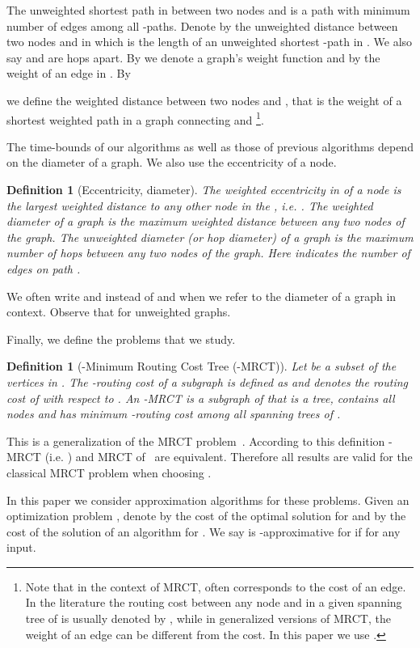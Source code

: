 \documentclass[11pt]{article}
\newtheorem{definition}[theorem]{Definition}
\begin{document}
The unweighted shortest path in  between two nodes  and  is a path with minimum number of edges among all -paths. Denote by  the unweighted distance between two nodes  and  in  which is the length of an unweighted shortest -path in . We also say  and  are  hops apart. By  we denote a graph's weight function and by  the weight of an edge in . By 

 we define the weighted distance between two nodes  and , that is the weight of a shortest weighted path in a graph  connecting  and \footnote{ Note that in the context of MRCT,  often corresponds to the cost of an edge. In the literature the routing cost between any node  and  in a given spanning tree  of  is usually denoted by , while in generalized versions of MRCT, the weight of an edge can be different from the cost. In this paper we use .}. 

The time-bounds of our algorithms as well as those of previous algorithms depend on the diameter of a graph. We also use the eccentricity of a node.
\begin{definition}[Eccentricity, diameter]
The \emph{weighted eccentricity}  in  of a node  is the largest weighted distance to any other node in the , i.e. . The \emph{weighted diameter}  of a graph  is the maximum weighted distance between any two nodes of the graph. The \emph{unweighted diameter} (or hop diameter)  of a graph  is the maximum number of hops between any two nodes of the graph. Here  indicates the number of edges on path .
\end{definition}
We often write  and  instead of  and  when we refer to the diameter of a graph  in context. Observe that  for unweighted graphs. 

Finally, we define the problems that we study.

\begin{definition}[-Minimum Routing Cost Tree (-MRCT)]
Let  be a subset of the vertices  in . The -routing cost of a subgraph  is defined as  and denotes the routing cost of  with respect to . An -MRCT is a subgraph  of  that is a tree, contains all nodes  and has minimum -routing cost  among all spanning trees of . 
\end{definition}
This is a generalization of the MRCT problem~\cite{WuLBCRT99}. According to this definition -MRCT (i.e. ) and MRCT of~\cite{WuLBCRT99} are equivalent. Therefore all results are valid for the classical MRCT problem when choosing .

In this paper we consider approximation algorithms for these problems. Given an optimization problem , denote by  the cost of the optimal solution for  and by  the cost of the solution of an algorithm  for . We say  is -approximative for  if  for any input.
\end{document}

